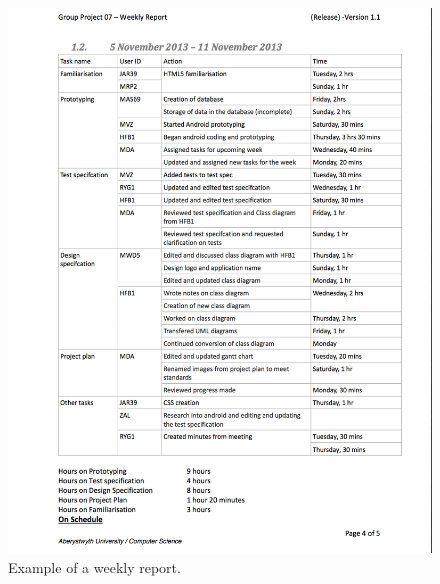 \documentclass[12pt]{article}
\begin{document}
\begin{figure}
\includegraphics[scale=0.60]{Final_report/weekly_report.png}
\caption{Example of a weekly report.}
\end{figure}
\newpage
\end{document}
